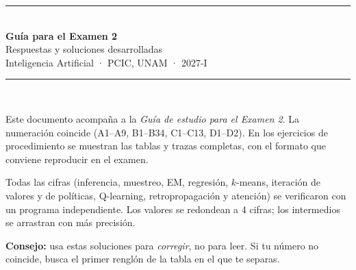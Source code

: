 

\fancyhead[L]{\small\textcolor{gris}{Inteligencia Artificial 2027-I · Guía para el Examen 2}}
\fancyhead[R]{\small\textcolor{verde}{Respuestas}}
\fancyfoot[C]{\small\thepage}



\begin{titlepage}
\centering
\vspace*{1.5cm}
{\color{verde}\rule{\linewidth}{1.2pt}}\\[0.6cm]
{\Huge\bfseries\color{verde} Guía para el Examen 2}\\[0.3cm]
{\LARGE Respuestas y soluciones desarrolladas}\\[0.2cm]
{\large Inteligencia Artificial · PCIC, UNAM · 2027-I}\\[0.4cm]
{\color{verde}\rule{\linewidth}{1.2pt}}\\[1.2cm]
\begin{minipage}{0.84\linewidth}\large
Este documento acompaña a la \emph{Guía de estudio para el Examen 2}. La numeración coincide
(A1–A9, B1–B34, C1–C13, D1–D2). En los ejercicios de procedimiento se muestran las tablas y trazas
completas, con el formato que conviene reproducir en el examen.

\vspace{0.5cm}
Todas las cifras (inferencia, muestreo, EM, regresión, $k$-means, iteración de valores y de
políticas, Q-learning, retropropagación y atención) se verificaron con un programa independiente.
Los valores se redondean a 4 cifras; los intermedios se arrastran con más precisión.

\vspace{0.5cm}
\textbf{Consejo:} usa estas soluciones para \emph{corregir}, no para leer. Si tu número no coincide,
busca el primer renglón de la tabla en el que te separas.
\end{minipage}
\vfill
\end{titlepage}

\tableofcontents
\newpage







